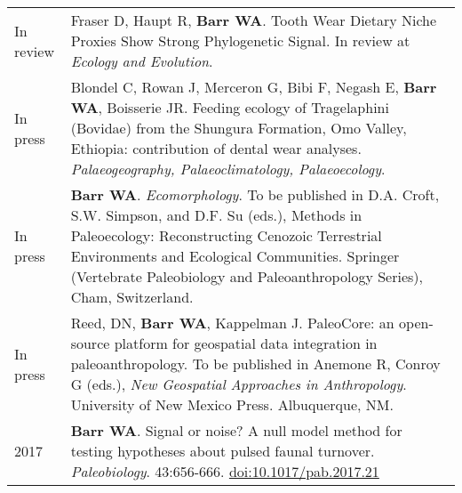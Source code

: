 \documentclass{article}
\begin{document}
\begin{longtable}{p{}p{}}

 In review & Fraser D, Haupt R,  {\bfseries Barr WA}. Tooth Wear Dietary Niche Proxies Show Strong Phylogenetic Signal.  In review at \emph{Ecology and Evolution}.\\[4pt]




In press & Blondel C, Rowan J, Merceron G, Bibi F,  Negash E, {\bfseries Barr WA}, Boisserie JR. Feeding ecology of Tragelaphini (Bovidae) from the Shungura Formation, Omo Valley, Ethiopia: contribution of dental wear analyses.  \emph{Palaeogeography, Palaeoclimatology, Palaeoecology}.\\[4pt]

In press & {\bfseries Barr WA}. \emph{Ecomorphology}. To be published in D.A. Croft, S.W. Simpson, and D.F. Su (eds.), Methods in Paleoecology: Reconstructing Cenozoic Terrestrial Environments and Ecological Communities. Springer (Vertebrate Paleobiology and Paleoanthropology Series), Cham, Switzerland.\\[4pt]

In press & Reed, DN, {\bfseries Barr WA}, Kappelman J. PaleoCore: an open-source platform for geospatial data integration in paleoanthropology. To be published in Anemone R, Conroy G (eds.), \emph{New Geospatial Approaches in Anthropology}. University of New Mexico Press. Albuquerque, NM.\\[4pt]


2017 & {\bfseries Barr WA}. Signal or noise? A null model method for testing hypotheses about pulsed faunal turnover. \emph{Paleobiology}. 43:656-666. \href{https://doi.org/10.1017/pab.2017.21}{doi:10.1017/pab.2017.21}\\[4pt]


\end{longtable}
\end{document}
